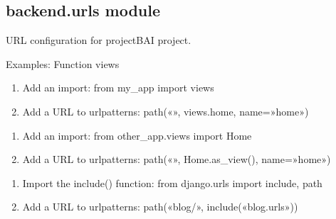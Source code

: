 \documentclass[letterpaper,10pt,polish]{sphinxmanual}
\begin{document}
\subsection{backend.urls module}
\label{\detokenize{backend:module-backend.urls}}\label{\detokenize{backend:backend-urls-module}}
\sphinxAtStartPar
URL configuration for projectBAI project.
\begin{description}
\sphinxAtStartPar
{}

\end{description}

\sphinxAtStartPar
Examples:
Function views
\begin{enumerate}
%
\item {} 
\sphinxAtStartPar
Add an import:  from my\_app import views

\item {} 
\sphinxAtStartPar
Add a URL to urlpatterns:  path(«», views.home, name=»home»)

\end{enumerate}
\begin{description}
\begin{enumerate}
%
\item {} 
\sphinxAtStartPar
Add an import:  from other\_app.views import Home

\item {} 
\sphinxAtStartPar
Add a URL to urlpatterns:  path(«», Home.as\_view(), name=»home»)

\end{enumerate}

\begin{enumerate}
%
\item {} 
\sphinxAtStartPar
Import the include() function: from django.urls import include, path

\item {} 
\sphinxAtStartPar
Add a URL to urlpatterns:  path(«blog/», include(«blog.urls»))

\end{enumerate}

\end{description}
\end{document}
